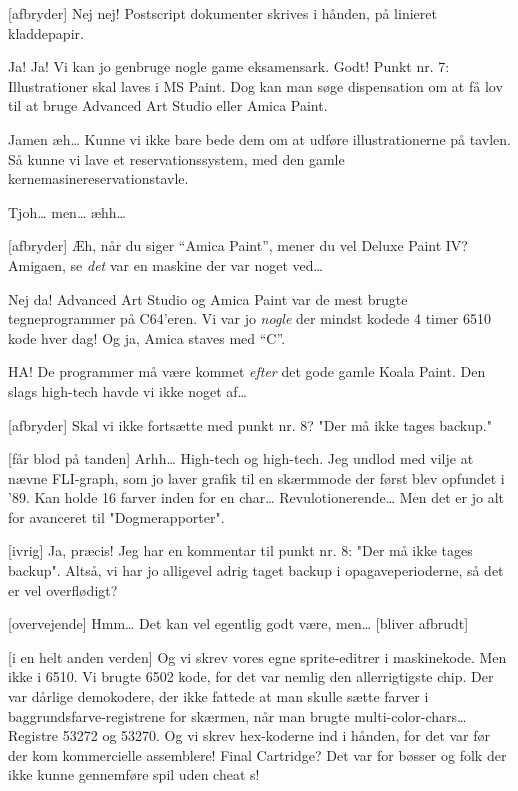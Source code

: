 \documentclass[danish]{article}
\begin{document}
\begin{sketch}
[afbryder] Nej nej! Postscript dokumenter skrives i hånden, på linieret
kladdepapir.

 Ja! Ja! Vi kan jo genbruge nogle game eksamensark. 
Godt!  Punkt nr. 7: Illustrationer skal laves i MS Paint. Dog kan man søge
dispensation om at få lov til at bruge Advanced Art Studio eller Amica Paint.

 Jamen æh\ldots{} Kunne vi ikke bare bede dem om at udføre
illustrationerne på tavlen. Så kunne vi lave et reservationssystem, med den
gamle kernemasinereservationstavle.

 Tjoh\ldots{} men\ldots{} æhh\ldots{} 

[afbryder] Æh, når du siger ``Amica Paint'', mener du vel Deluxe Paint
IV?  Amigaen, se \emph{det} var en maskine der var noget ved\ldots{}

 Nej da! Advanced Art Studio og Amica Paint var de mest brugte
tegneprogrammer på C64'eren. Vi var jo \emph{nogle} der mindst kodede 4 timer
6510 kode hver dag! Og ja, Amica staves med ``C''.

 HA! De programmer må være kommet \emph{efter} det gode gamle Koala
Paint.  Den slags high-tech havde vi ikke noget af\ldots{}

[afbryder] Skal vi ikke fortsætte med punkt nr. 8? "Der må ikke tages
backup."

[får blod på tanden] Arhh\ldots{} High-tech og high-tech. Jeg undlod med
vilje at nævne FLI-graph, som jo laver grafik til en skærmmode der først blev
opfundet i '89. Kan holde 16 farver inden for en char\ldots{} 
Revulotionerende\ldots{}  Men det er jo alt for
avanceret til "Dogmerapporter".

[ivrig] Ja, præcis! Jeg har en kommentar til punkt nr. 8: "Der må ikke
tages backup". Altså, vi har jo alligevel adrig taget backup i
opagaveperioderne, så det er vel overflødigt?

[overvejende] Hmm\ldots{} Det kan vel egentlig godt være, men\ldots{}
[bliver afbrudt]

[i en helt anden verden] Og vi skrev vores egne sprite-editrer i
maskinekode. Men ikke i 6510. Vi brugte 6502 kode, for det var nemlig den
allerrigtigste chip. Der var dårlige demokodere, der ikke fattede at man skulle
sætte farver i baggrundsfarve-registrene for skærmen, når man brugte
multi-color-chars\ldots{} Registre 53272 og 53270. Og vi skrev hex-koderne ind i
hånden, for det var før der kom kommercielle assemblere! Final Cartridge? Det
var for bøsser og folk der ikke kunne gennemføre spil uden cheat s!


\end{sketch}
\end{document}
